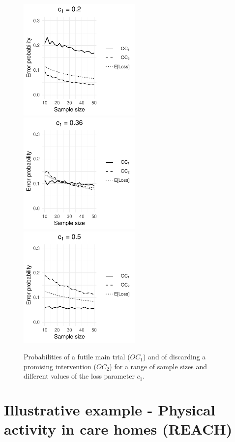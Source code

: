 \documentclass[AMA,STIX1COL]{WileyNJD-v2}
\begin{document}
\begin{figure}
\centering
\includegraphics[height=6cm, trim={0 0 2.5cm 0},clip]{./figures/tiga_c02}\hspace{0.5cm}
\includegraphics[height=6cm, trim={1.1cm 0 2.5cm 0},clip]{./figures/tiga_c036}\hspace{0.5cm}
\includegraphics[height=6cm, trim={1.1cm 0 0 0},clip]{./figures/tiga_c05}
\caption{Probabilities of a futile main trial ($OC_1$) and of discarding a promising intervention ($OC_2$) for a range of sample sizes and different values of the loss parameter $c_1$.}
\label{fig:tiga_ocs}
\end{figure}

\section{Illustrative example - Physical activity in care homes (REACH)}\label{sec:REACH}
\end{document}
